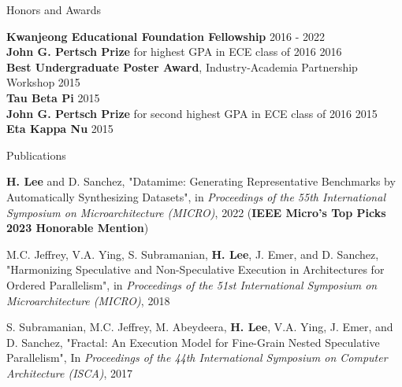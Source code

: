 \documentclass{resume} %
\begin{document}
\newpage


\begin{rSection}{Honors and Awards}

{\bf Kwanjeong Educational Foundation Fellowship} \hfill {2016 - 2022} \\
{\bf John G. Pertsch Prize} for highest GPA in ECE class of 2016 \hfill{2016} \\
{\bf Best Undergraduate Poster Award}, Industry-Academia Partnership Workshop \hfill {2015} \\
{\bf Tau Beta Pi} \hfill {2015} \\
{\bf John G. Pertsch Prize} for second highest GPA in ECE class of 2016 \hfill {2015} \\
{\bf Eta Kappa Nu} \hfill {2015} 

\end{rSection}


\begin{rSection}{Publications}

{\bf H. Lee} and D. Sanchez,
"Datamime: Generating Representative Benchmarks by Automatically Synthesizing Datasets",
in \textit{Proceedings of the 55th International Symposium on Microarchitecture (MICRO)}, 2022 %
(\textbf{IEEE Micro's Top Picks 2023 Honorable Mention})

M.C. Jeffrey, V.A. Ying, S. Subramanian, {\bf H. Lee}, J. Emer, and D. Sanchez,
"Harmonizing Speculative and Non-Speculative Execution in Architectures for Ordered Parallelism",
in \textit{Proceedings of the 51st International Symposium on Microarchitecture (MICRO)}, 2018 %

S. Subramanian, M.C. Jeffrey, M. Abeydeera, {\bf H. Lee}, V.A. Ying, J. Emer, and D. Sanchez, 
"Fractal: An Execution Model for Fine-Grain Nested Speculative Parallelism",
In \textit{Proceedings of the 44th International Symposium on Computer Architecture (ISCA)}, 2017 %

\end{rSection}
\end{document}
